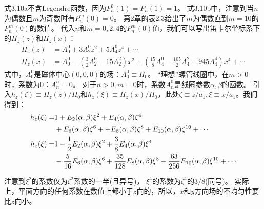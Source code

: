 式3.10a不含Legendre函数，因为$P_n^0(1)=P_n(1)=1$。
式3.10b中，注意到当$n$为偶数且$m$为奇数时有$ P_n^m(0)=0$。
第2章的表2.3给出了$m$为偶数直到$m=10$的$P_n^m(0)$的数值。
代入$n$和$m=0,2,4$的$P_n^m(0)$值，我们可以写出笛卡尔坐标系下的$H_z(z)$和$H_z(x)$：
\begin{subequations}\label{eqn:solenoid coil hz2}
	\begin{align}
H_z(z)&=A_0^0+3A_2^0z^2+5A_4^0z^4+\cdots\\
H_z(x)&=A_0^0-\left(\frac{3}{2}A_2^0-15A_2^2\right)x^2+\left(\frac{15}{8}A_4^0-\frac{105}{2}A_4^2+945A_4^4\right)x^4+\cdots
\end{align}
\end{subequations}
式中，$A_0^0$是磁体中心$(0,0,0)$的场：$A_0^0\equiv H_0$。
``理想''螺管线圈中，在$m>0$时，系数为0：$A_n^n=0$。
对于$n>0, m=0$时，系数$A_n^0$是线圈参数$\alpha, \beta$的函数。
引入$h_z(\zeta)\equiv H_z(z)/H_0$和$h_z(\xi)\equiv H_z(x)/H_0$，此处$\zeta \equiv z/a_1,\xi\equiv x/a_1$。我们得到：
\begin{subequations}\label{eqn:solenoid coil hz2}
	\begin{align}
h_z(\zeta)=&1+E_2(\alpha,\beta)\xi^2+E_4(\alpha,\beta)\zeta^4\notag\\
&+E_6(\alpha,\beta)\zeta^6++E_8(\alpha,\beta)\zeta^8+E_{10}(\alpha,\beta)\zeta^{10}+\cdots \\
h_z(\xi) =&1-\frac{1}{2}E_2(\alpha,\beta)\xi^2+\frac{3}{8}E_4(\alpha,\beta)\xi^4\notag\\
&-\frac{5}{16}E_6(\alpha,\beta)\xi^6+\frac{35}{128}E_8(\alpha,\beta)\xi^8-\frac{63}{256}E_{10}(\alpha,\beta)\xi^{10}+\cdots
	\end{align}
\end{subequations}

注意到$\xi^2$的系数仅为$\zeta^2$系数的一半(且异号)，
$\xi^4$的系数为$\zeta^4$的$3/8$(同号)。
实际上，平面方向的任何系数在数值上都小于$z$向的，所以，$x$和$y$方向场的不均匀性要比$z$向小。


